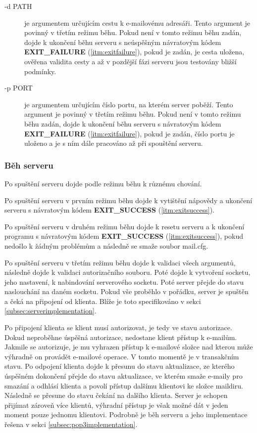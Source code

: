 \documentclass[11pt,a4paper]{report}
\begin{document}
\begin{description}
        \item [-d PATH] je argumentem určujícím cestu k e-mailovému adresáři. Tento argument je povinný v třetím režimu běhu. Pokud není v tomto režimu běhu zadán, dojde k ukončení běhu serveru s neúspěšným návratovým kódem \textbf{EXIT\_FAILURE} (\ref{itm:exitfailure}), pokud je zadán, je cesta uložena, ověřena validita cesty a až v pozdější fázi serveru jsou testovány bližší podmínky.
        \item [-p PORT] je argumentem určujícím číslo portu, na kterém server poběží. Tento argument je povinný v třetím režimu běhu. Pokud není v tomto režimu běhu zadán, dojde k ukončení běhu serveru s návratovým kódem \textbf{EXIT\_FAILURE} (\ref{itm:exitfailure}), pokud je zadán, číslo portu je uloženo a je s ním dále pracováno až při spouštění serveru.
    \end{description}
    \subsubsection{Běh serveru}
    Po spuštění serveru dojde podle režimu běhu k různému chování.\\ \par
    Po spuštění serveru v prvním režimu běhu dojde k vytištění nápovědy a ukončení serveru s návratovým kódem \textbf{EXIT\_SUCCESS} (\ref{itm:exitsuccess}). \par
    Po spuštění serveru v druhém režimu běhu dojde k resetu serveru a k ukončení programu s návratovým kódem \textbf{EXIT\_SUCCESS} (\ref{itm:exitsuccess}), pokud nedošlo k žádným problémům a následně se smaže soubor mail.cfg.\par
    Po spuštění serveru v třetím režimu běhu dojde k validaci všech argumentů, následně dojde k validaci autorizačního souboru. Poté dojde k vytvoření socketu, jeho nastavení, k nabindování serverového socketu. Poté server přejde do stavu naslouchání na daném socketu. Pokud vše proběhlo v pořádku, server je spuštěn a čeká na připojení od klienta. Blíže je toto specifikováno v sekci \ref{subsec:serverimplementation}.\par
    Po připojení klienta se klient musí autorizovat, je tedy ve stavu autorizace. Dokud neproběhne úspěšná autorizace, nedostane klient přístup k e-mailům. Jakmile se autorizuje, je mu vyhrazen přístup k e-mailové složce nad kterou může výhradně on provádět e-mailové operace. V tomto momentě je v transakčním stavu. Po odpojení klienta dojde k přesunu do stavu aktualizace, ze kterého úspěšném dokončení přejde do stavu aktualizace, ve kterém smaže e-maily pro smazání a odhlásí klienta a povolí přístup dalšímu klientovi ke složce maildiru. Následně se přesune do stavu čekání na dalšího klienta. Server je schopen přijímat zároveň více klientů, výhradní přístup je však možné dát v jeden moment pouze jednomu klientovi. Podrobně je běh serveru a jeho implementace řešena v sekci \ref{subsec:pop3implementation}.
\end{document}
